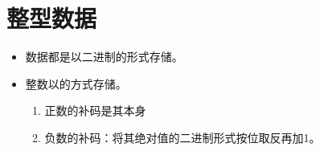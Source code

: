 \section{整型数据}

\begin{frame}
  \begin{itemize}
  \item 数据都是以二进制的形式存储。\vspace{0.1in}
  \item 整数以的方式存储。\vspace{0.1in}

    \begin{enumerate}
    \item
      正数的补码是其本身\\[0.1in]
    \item 
      负数的补码：将其绝对值的二进制形式按位取反再加1。
    \end{enumerate}

  \end{itemize}
\end{frame}
%
